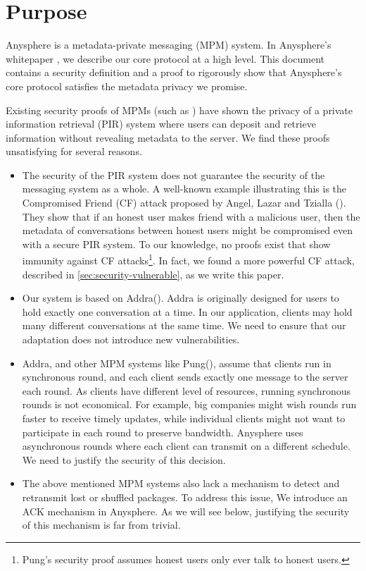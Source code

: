 \section{Purpose}
\label{sec:purpose}
Anysphere is a metadata-private messaging (MPM) system. In Anysphere's whitepaper \cite[Section 3]{whitepaper}, we describe our core protocol at a high level. This document contains a security definition and a proof to rigorously show that Anysphere's core protocol satisfies the metadata privacy we promise.

Existing security proofs of MPMs (such as \cite{corrigan2010dissent, corrigan2015riposte, angel2016unobservable, ahmad2021addra}) have shown the privacy of a private information retrieval (PIR) system where users can deposit and retrieve information without revealing metadata to the server. We find these proofs unsatisfying for several reasons.
\begin{itemize}
    \item The security of the PIR system does not guarantee the security of the messaging system as a whole. A well-known example illustrating this is the Compromised Friend (CF) attack proposed by Angel, Lazar and Tzialla (\cite{angel2018cf}). They show that if an honest user makes friend with a malicious user, then the metadata of conversations between honest users might be compromised even with a secure PIR system. To our knowledge, no proofs exist that show immunity against CF attacks\footnote{Pung's security proof \cite[Appendix C]{angel2018thesis} assumes honest users only ever talk to honest users.}. In fact, we found a more powerful CF attack, described in \cref{sec:security-vulnerable}, as we write this paper.
    
    \item Our system is based on Addra(\cite{ahmad2021addra}). Addra is originally designed for users to hold exactly one conversation at a time. In our application, clients may hold many different conversations at the same time. We need to ensure that our adaptation does not introduce new vulnerabilities.
    
    \item Addra, and other MPM systems like Pung(\cite{angel2016unobservable}), assume that clients run in synchronous round, and each client sends exactly one message to the server each round. As clients have different level of resources, running synchronous rounds is not economical. For example, big companies might wish rounds run faster to receive timely updates, while individual clients might not want to participate in each round to preserve bandwidth. Anysphere uses asynchronous rounds where each client can transmit on a different schedule. We need to justify the security of this decision.
    
    \item The above mentioned MPM systems also lack a mechanism to detect and retransmit lost or shuffled packages. To address this issue, We introduce an ACK mechanism in Anysphere. As we will see below, justifying the security of this mechanism is far from trivial.
\end{itemize}

